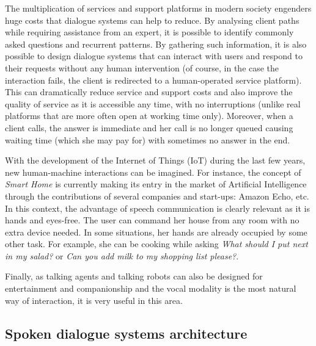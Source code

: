         The multiplication of services and support platforms in modern society engenders huge costs that dialogue systems can help to reduce. By analysing client paths while requiring assistance from an expert, it is possible to identify commonly asked questions and recurrent patterns. By gathering such information, it is also possible to design dialogue systems that can interact with users and respond to their requests without any human intervention (of course, in the case the interaction fails, the client is redirected to a human-operated service platform). This can dramatically reduce service and support costs and also improve the quality of service as it is accessible any time, with no interruptions (unlike real platforms that are more often open at working time only). Moreover, when a client calls, the answer is immediate and her call is no longer queued causing waiting time (which she may pay for) with sometimes no answer in the end.

        With the development of the Internet of Things (IoT) during the last few years, new human-machine interactions can be imagined. For instance, the concept of \textit{Smart Home} is currently making its entry in the market of Artificial Intelligence through the contributions of several companies and start-ups: Amazon Echo, etc. In this context, the advantage of speech communication is clearly relevant as it is hands and eyes-free. The user can command her house from any room with no extra device needed. In some situations, her hands are already occupied by some other task. For example, she can be cooking \cite{Laroche2013} while asking \textit{What should I put next in my salad?} or \textit{Can you add milk to my shopping list please?}.

        Finally, as talking agents and talking robots can also be designed for entertainment and companionship \cite{Gelin2010,Sidner2013} and the vocal modality is the most natural way of interaction, it is very useful in this area.
        
        \subsection{Spoken dialogue systems architecture}
        \label{soa:architecture}

